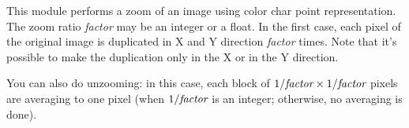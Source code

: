 This module performs a zoom of an image using color char point representation.
The zoom ratio {\em factor} may be an integer or a float.
In the first case, each pixel of the
original image is duplicated in X and Y direction {\em factor} times.
Note that it's possible to make the duplication only in the X or in the Y
direction.

You can also do unzooming: in this case, each block of $1/\mbox{\em factor} \times 1/\mbox{\em factor}$ pixels are averaging to one pixel (when $1/\mbox{\em factor}$ is an integer; otherwise, no averaging is done).



